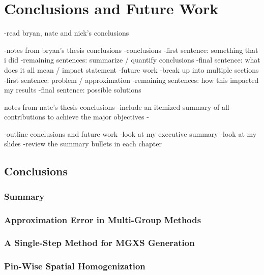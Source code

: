 \chapter{Conclusions and Future Work}
\label{chap:conclusions-future-work}

-read bryan, nate and nick's conclusions

-notes from bryan's thesis conclusions
  -conclusions
    -first sentence: something that i did
    -remaining sentences: summarize / quantify conclusions
    -final sentence: what does it all mean / impact statement
  -future work
    -break up into multiple sections
    -first sentence: problem / approximation
    -remaining sentences: how this impacted my results
    -final sentence: possible solutions  

notes from nate's thesis conclusions
  -include an itemized summary of all contributions to achieve the major objectives
  -

-outline conclusions and future work
  -look at my executive summary
  -look at my slides
  -review the summary bullets in each chapter

\section{Conclusions}
\label{chap:conclusions}

\subsection{Summary}
\label{chap:summary}

\subsection{Approximation Error in Multi-Group Methods}
\label{chap:approx-error}

\subsection{A Single-Step Method for MGXS Generation}
\label{chap:approx-error}

\subsection{Pin-Wise Spatial Homogenization}
\label{chap:approx-error}


